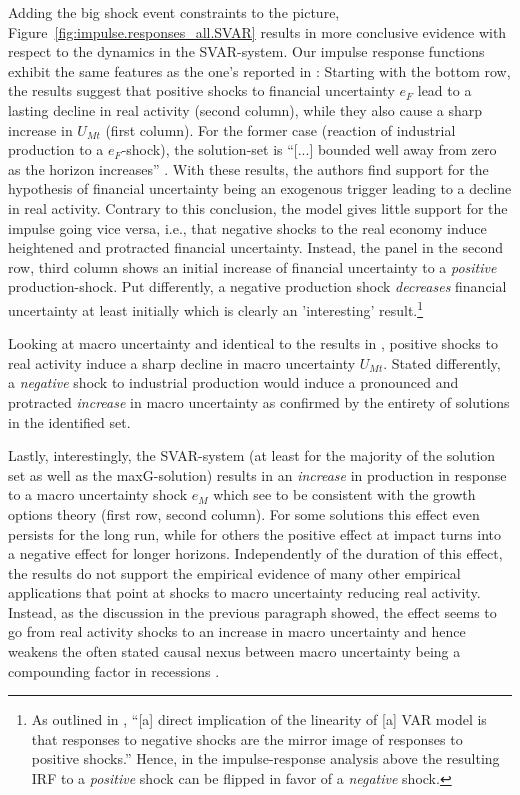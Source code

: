 \documentclass[a4paper,11pt,listof=nochaptergap,oneside,pointednumbers,bibtotoc,bigheadings,liststotoc,hidelinks]{scrbook}
\theoremstyle{mysatz}
\theoremstyle{mydefinition}
\theoremstyle{mytheorem}
\theoremstyle{mybemerkung}
\begin{document}
Adding the big shock event constraints to the picture, Figure~\ref{fig:impulse.responses_all.SVAR} results in more conclusive evidence with respect to the dynamics in the SVAR-system. Our impulse response functions exhibit the same features as the one's reported in \citet{ludvigsonetal:19}: Starting with the bottom row, the results suggest that positive shocks to financial uncertainty $e_F$ lead to a lasting decline in real activity (second column), while they also cause a sharp increase in $U_{Mt}$ (first column). For the former case (reaction of industrial production to a $e_F$-shock), the solution-set is ``[...] bounded well away from zero as the horizon increases'' \citep[p. 22]{ludvigsonetal:19}. With these results, the authors find support for the hypothesis of financial uncertainty being an exogenous trigger leading to a decline in real activity. Contrary to this conclusion, the model gives little support for the impulse going vice versa, i.e., that negative shocks to the real economy induce heightened and protracted financial uncertainty. Instead, the panel in the second row, third column shows an initial increase of financial uncertainty to a \textit{positive} production-shock. Put differently, a negative production shock \textit{decreases} financial uncertainty at least initially \citep{ludvigsonetal:19} which is clearly an 'interesting' result.\footnote{As outlined in \citet[p. 112]{lutkepohlkilian:17}, ``[a] direct implication of the linearity of [a] VAR model is that responses to negative shocks are the mirror image of responses to positive shocks.'' Hence, in the impulse-response analysis above the resulting IRF to a \textit{positive} shock can be flipped in favor of a \textit{negative} shock.}

Looking at macro uncertainty and identical to the results in \citet{ludvigsonetal:19}, positive shocks to real activity induce a sharp decline in macro uncertainty $U_{Mt}$. Stated differently, a \textit{negative} shock to industrial production would induce a pronounced and protracted \textit{increase} in macro uncertainty as confirmed by the entirety of solutions in the identified set. 

Lastly, interestingly, the SVAR-system (at least for the majority of the solution set as well as the maxG-solution) results in an \textit{increase} in production in response to a macro uncertainty shock $e_{M}$ which \citet{ludvigsonetal:19} see to be consistent with the growth options theory (first row, second column). For some solutions this effect even persists for the long run, while for others the positive effect at impact turns into a negative effect for longer horizons. Independently of the duration of this effect, the results do not support the empirical evidence of many other empirical applications that point at shocks to macro uncertainty reducing real activity. Instead, as the discussion in the previous paragraph showed, the effect seems to go from real activity shocks to an increase in macro uncertainty and hence weakens the often stated causal nexus between macro uncertainty being a compounding factor in recessions \citep{ludvigsonetal:19}. 
\end{document}
